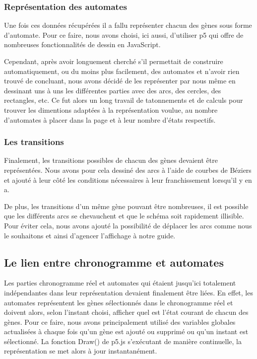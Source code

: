 \subsubsection{Représentation des automates}
Une fois ces données récupérées il a fallu représenter chacun des gènes sous forme d'automate. Pour ce faire, nous avons choisi, ici aussi, d'utiliser p5 qui offre de nombreuses fonctionnalités de dessin en JavaScript. 
\newline

Cependant, après avoir longuement cherché s'il permettait de construire automatiquement, ou du moins plus facilement, des automates et n'avoir rien trouvé de concluant, nous avons décidé de les représenter par nous même en dessinant uns à uns les différentes parties avec des arcs, des cercles, des rectangles, etc. Ce fut alors un long travail de tatonnements et de calculs pour trouver les dimentions adaptées à la représentation voulue, au nombre d'automates à placer dans la page et à leur nombre d'états respectifs.

\bigbreak
\subsubsection{Les transitions}
Finalement, les transitions possibles de chacun des gènes devaient être représentées. Nous avons pour cela dessiné des arcs à l'aide de courbes de Béziers et ajouté à leur côté les conditions nécessaires à leur franchissement lorsqu'il y en a. 
\newline

De plus, les transitions d'un même gène pouvant être nombreuses, il est possible que les différents arcs se chevauchent et que le schéma soit rapidement illisible. Pour éviter cela, nous avons ajouté la possibilité de déplacer les arcs comme nous le souhaitons et ainsi d'agencer l'affichage à notre guide. 
\bigbreak
\bigbreak
\subsection{Le lien entre chronogramme et automates}
\bigbreak

Les parties chronogramme réel et automates qui étaient jusqu’ici totalement indépendantes dans leur représentation devaient finalement être liées. En effet, les automates représentent les gènes sélectionnés dans le chronogramme réel et doivent alors, selon l’instant choisi, afficher quel est l’état courant de chacun des gènes. 
Pour ce faire, nous avons principalement utilisé des variables globales actualisées à chaque fois qu’un gène est ajouté ou supprimé ou qu’un instant est sélectionné. La fonction Draw() de p5.js s’exécutant de manière continuelle, la représentation se met alors à jour instantanément. 
